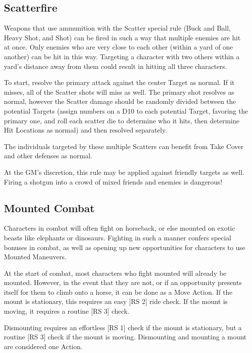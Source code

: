 \documentclass[oneside,11pt,english]{book}
\begin{document}
\subsection{Scatterfire}\label{sec:scatterfire} %
Weapons that use ammunition with the Scatter special rule (Buck and Ball, Heavy
Shot, and Shot) can be fired in such a way that multiple enemies are hit at
once. Only enemies who are very close to each other (within a yard of one
another) can be hit in this way. Targeting a character with two others within a
yard’s distance away from them could result in hitting all three characters.

To start, resolve the primary attack against the center Target as normal. If it
misses, all of the Scatter shots will miss as well. The primary shot resolves as
normal, however the Scatter damage should be randomly divided between the
potential Targets (assign numbers on a D10 to each potential Target, favoring
the primary one, and roll each scatter die to determine who it hits, then
determine Hit Locations as normal) and then resolved separately.

The individuals targeted by these multiple Scatters can benefit from Take Cover and other defenses as normal.

At the GM’s discretion, this rule may be applied against friendly targets as
well. Firing a shotgun into a crowd of mixed friends and enemies is dangerous!

\subsection{Mounted Combat}\label{sec:mounted-combat}
Characters in combat will often fight on horseback, or else mounted on exotic
beasts like elephants or dinosaurs. Fighting in such a manner confers special
bonuses in combat, as well as opening up new opportunities for characters to use
Mounted Maneuvers.

At the start of combat, most characters who fight mounted will already be
mounted. However, in the event that they are not, or if an opportunity presents
itself for them to climb onto a horse, it can be done as a Move Action. If the
mount is stationary, this requires an easy [RS 2] ride check. If the mount is
moving, it requires a routine [RS 3] check.

Dismounting requires an effortless [RS 1] check if the mount is stationary, but
a routine [RS 3] check if the mount is moving. Dismounting and mounting a mount
are considered one Action.
\end{document}

